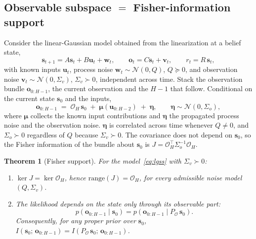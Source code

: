 \documentclass[11pt]{article}
\newcommand{\Obs}{\mathcal{O}}
\newtheorem{theorem}{Theorem}
\theoremstyle{remark}
\begin{document}
\subsection{Observable subspace $=$ Fisher-information support}
\label{sec:fisher}

Consider the linear-Gaussian model obtained from the linearization at a belief state,
\begin{equation}
  \bm{s}_{t+1} = A \bm{s}_t + B \bm{u}_t + \bm{w}_t, \qquad
  \bm{o}_t = C \bm{s}_t + \bm{v}_t, \qquad
  r_t = R\, \bm{s}_t,
  \label{eq:lgss}
\end{equation}
with known inputs $\bm{u}_t$, process noise $\bm{w}_t \sim \mathcal N(0, Q)$, $Q \succeq 0$, and observation noise $\bm{v}_t \sim \mathcal N(0, \Sigma_v)$, $\Sigma_v \succ 0$, independent across time. Stack the observation bundle $\bm{o}_{0:H-1}$, the current observation and the $H{-}1$ that follow. Conditional on the current state $\bm{s}_0$ and the inputs,
\begin{equation}
  \bm{o}_{0:H-1} \;=\; \mathcal{O}_H\, \bm{s}_0 \;+\; \bm{\mu}(\bm{u}_{0:H-2}) \;+\; \bm{\eta},
  \qquad \bm{\eta} \sim \mathcal N(0, \Sigma_o),
  \label{eq:bundle}
\end{equation}
where $\bm{\mu}$ collects the known input contributions and $\bm{\eta}$ the propagated process noise and the observation noise. $\bm{\eta}$ is correlated across time whenever $Q \neq 0$, and $\Sigma_o \succ 0$ regardless of $Q$ because $\Sigma_v \succ 0$. The covariance does not depend on $\bm{s}_0$, so the Fisher information of the bundle about $\bm{s}_0$ is $J = \mathcal{O}_H^\top \Sigma_o^{-1} \mathcal{O}_H$.

\begin{theorem}[Fisher support]\label{thm:support}
For the model~\eqref{eq:lgss} with $\Sigma_v \succ 0$:
\begin{enumerate}
\item[(a)] $\ker J = \ker \mathcal{O}_H$, hence $\mathrm{range}(J) = \Obs_H$, for every admissible noise model $(Q, \Sigma_v)$.
\item[(b)] The likelihood depends on the state only through its observable part:
\[ p(\bm{o}_{0:H-1} \mid \bm{s}_0) = p(\bm{o}_{0:H-1} \mid P_{\Obs}\, \bm{s}_0). \]
Consequently, for any proper prior over $\bm{s}_0$, $I(\bm{s}_0;\, \bm{o}_{0:H-1}) = I(P_{\Obs}\, \bm{s}_0;\, \bm{o}_{0:H-1})$.
\end{enumerate}
\end{theorem}
\end{document}
